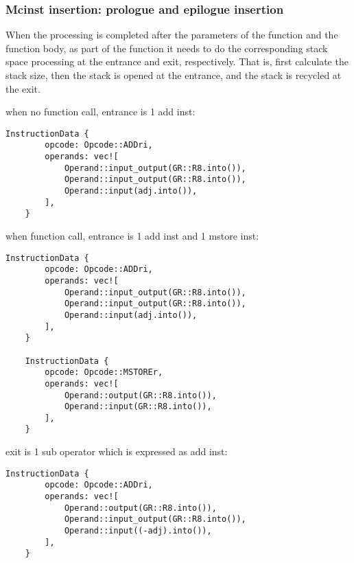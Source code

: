 \subsubsection{Mcinst insertion: prologue and epilogue insertion}

When the processing is completed after the parameters of the function and the function body, 
as part of the function it needs to do the corresponding stack space processing at the entrance and exit, respectively. 
That is, first calculate the stack size, then the stack is opened at the entrance, and the stack is recycled at the exit.

when no function call, entrance is 1 add inst:
\begin{lstlisting}[language={}]
    InstructionData {
        opcode: Opcode::ADDri,
        operands: vec![
            Operand::input_output(GR::R8.into()),
            Operand::input_output(GR::R8.into()),
            Operand::input(adj.into()),
        ],
    }
\end{lstlisting}

when function call, entrance is  1 add inst and 1 mstore inst:
\begin{lstlisting}[language={}]
    InstructionData {
        opcode: Opcode::ADDri,
        operands: vec![
            Operand::input_output(GR::R8.into()),
            Operand::input_output(GR::R8.into()),
            Operand::input(adj.into()),
        ],
    }

    InstructionData {
        opcode: Opcode::MSTOREr,
        operands: vec![
            Operand::output(GR::R8.into()),
            Operand::input(GR::R8.into()),
        ],
    }
\end{lstlisting}

exit is 1 sub operator which is expressed as add inst:
\begin{lstlisting}[language={}]
    InstructionData {
        opcode: Opcode::ADDri,
        operands: vec![
            Operand::output(GR::R8.into()),
            Operand::input_output(GR::R8.into()),
            Operand::input((-adj).into()),
        ],
    }
\end{lstlisting}